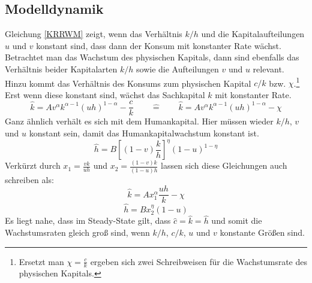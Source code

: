 \subsection*{Modelldynamik}\label{sec:Modelldynamik}
Gleichung \eqref{KRRWM} zeigt, wenn das Verhältnis $k/h$ und die Kapitalaufteilungen $u$ und $v$ konstant sind, dass dann der Konsum mit konstanter Rate wächst. 
Betrachtet man das Wachstum des physischen Kapitals, dann sind ebenfalls das Verhältnis beider Kapitalarten $k/h$ sowie die Aufteilungen $v$ und $u$ relevant. Hinzu kommt das Verhältnis des Konsums zum physischen Kapital $c/k$ bzw. $\chi$.\footnote{Ersetzt man $\chi=\frac{c}{k}$ ergeben sich zwei Schreibweisen für die Wachstumsrate des physischen Kapitals.} Erst wenn diese konstant sind, wächst das Sachkapital $k$ mit konstanter Rate.
\begin{equation}
\hat{k}=Av^\alpha k^{\alpha-1}(uh)^{1-\alpha}-\frac{c}{k} \qquad \hat{=} \qquad
\hat{k}=Av^\alpha k^{\alpha-1}(uh)^{1-\alpha}-\chi 
\end{equation}
Ganz ähnlich verhält es sich mit dem Humankapital. Hier müssen wieder $k/h$, $v$ und $u$ konstant sein, damit das Humankapitalwachstum konstant ist. 
\begin{equation}
\hat{h}=B\left[(1-v)\frac{k}{h}\right]^{\eta}(1-u)^{1-\eta}
\end{equation}
Verkürzt durch $x_1=\frac{vk}{uh}$ und $x_2=\frac{(1-v)k}{(1-u)h}$ lassen sich diese Gleichungen auch schreiben als:
\begin{equation}
\boxed{\hat{k}=Ax_1^\alpha \frac{uh}{k}-\chi}
\end{equation}
\begin{equation}
\boxed{\hat{h}=Bx_2^\eta(1-u)}
\end{equation}
Es liegt nahe, dass im Steady-State gilt, dass $\hat{c}=\hat{k}=\hat{h}$ und somit die Wachstumsraten gleich gro{\ss} sind, wenn $k/h$, $c/k$, $u$ und $v$ konstante Grö{\ss}en sind. 

